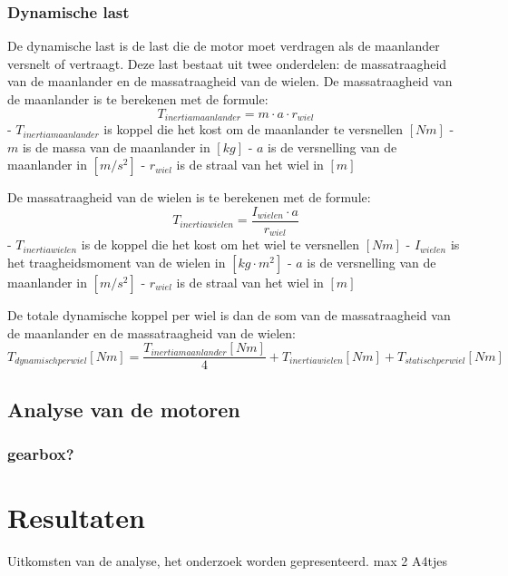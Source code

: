\documentclass{article}
\begin{document}
\subsubsection{Dynamische last}
    De dynamische last is de last die de motor moet verdragen als de maanlander versnelt of vertraagt. 
    Deze last bestaat uit twee onderdelen: de massatraagheid van de maanlander en de massatraagheid van de wielen.
    De massatraagheid van de maanlander is te berekenen met de formule:
    $$T_{inertiamaanlander} = m \cdot a \cdot r_{wiel}$$
    - $T_{inertiamaanlander}$ is koppel die het kost om de maanlander te versnellen $[Nm]$ \newline
    - $m$ is de massa van de maanlander in $[kg]$ \newline
    - $a$ is de versnelling van de maanlander in $[m/s^2]$ \newline
    - $r_{wiel}$ is de straal van het wiel in $[m]$ \newline \newline

    De massatraagheid van de wielen is te berekenen met de formule:
    $$T_{inertiawielen} = \frac{I_{wielen} \cdot a}{r_{wiel}}$$
    - $T_{inertiawielen}$ is de koppel die het kost om het wiel te versnellen $[Nm]$ \newline
    - $I_{wielen}$ is het traagheidsmoment van de wielen in $[kg \cdot m^2]$ \newline
    - $a$ is de versnelling van de maanlander in $[m/s^2]$ \newline
    - $r_{wiel}$ is de straal van het wiel in $[m]$ \newline \newline

    De totale dynamische koppel per wiel is dan de som van de massatraagheid van de maanlander en de massatraagheid van de wielen:
    $$T_{dynamisch per wiel}[Nm] = \frac{T_{inertiamaanlander}[Nm]}{4} + T_{inertiawielen}[Nm] + T_{statischperwiel}[Nm]$$ 


\subsection{Analyse van de motoren}
\subsubsection{gearbox?}

\section{Resultaten}
    Uitkomsten van de analyse, het onderzoek worden gepresenteerd. max 2 A4tjes
\end{document}
